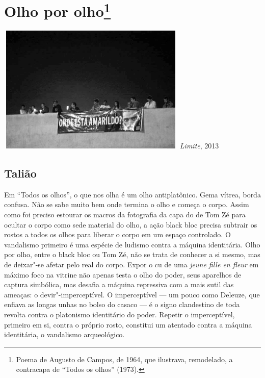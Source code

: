 \section*{Olho por olho\protect\footnote{\MakeUppercase{P}oema de \MakeUppercase{A}ugusto de
  \MakeUppercase{C}ampos, de 1964, que ilustrava, remodelado, a contracapa de ``\MakeUppercase{T}odos os
  olhos'' (1973).}}

\begin{center}
\includegraphics[width=9cm,height=6.1cm]{Imgs/img7.jpg}
\emph{Limite}, 2013
\end{center}

\subsection{Talião}

Em ``Todos os olhos'', o que nos olha é um olho
antiplatônico. Gema vítrea, borda confusa. Não se sabe muito bem onde
termina o olho e começa o corpo. Assim como foi preciso estourar os
macros da fotografia da capa do  de Tom Zé para ocultar o corpo como
sede material do olho, a ação black bloc precisa subtrair os rostos a
todos os olhos para liberar o corpo em um espaço controlado. O
vandalismo primeiro é uma espécie de ludismo contra a máquina
identitária. Olho por olho, entre o black bloc ou Tom Zé, não se trata
de conhecer a si mesmo, mas de deixar"-se afetar pelo real do corpo.
Expor o cu de uma \emph{jeune fille en fleur} em máximo foco na
vitrine não apenas testa o olho do poder, seus aparelhos de captura
simbólica, mas desafia a máquina repressiva com a mais sutil das
ameaças: o devir"-imperceptível. O imperceptível --- um pouco como
Deleuze, que enfiava as longas unhas no bolso do casaco --- é o signo
clandestino de toda revolta contra o platonismo identitário do poder.
Repetir o imperceptível, primeiro em si, contra o próprio rosto,
constitui um atentado contra a máquina identitária, o vandalismo
arqueológico.

